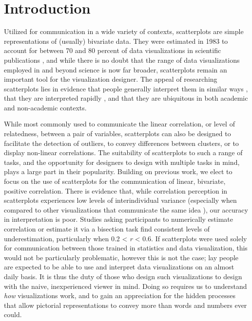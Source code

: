 \documentclass[manuscript,screen,review]{acmart}
\begin{document}
\setlength{\parskip}{-0.1pt}

\section{Introduction}\label{sec-intro}

Utilized for communication in a wide variety of contexts, scatterplots
are simple representations of (usually) bivariate data. They were
estimated in 1983 to account for between 70 and 80 percent of data
visualizations in scientific publications \citep{tufte_1983}, and while
there is no doubt that the range of data visualizations employed in and
beyond science is now far broader, scatterplots remain an important tool
for the visualization designer. The appeal of researching scatterplots
lies in evidence that people generally interpret them in similar ways
\citep{kay_2015}, that they are interpreted rapidly
\citep{rensink_2014}, and that they are ubiquitous in both academic
\citep{tufte_1983} and non-academic contexts.

While most commonly used to communicate the linear correlation, or level
of relatedness, between a pair of variables, scatterplots can also be
designed to facilitate the detection of outliers, to convey differences
between clusters, or to display non-linear correlations. The suitability
of scatterplots to such a range of tasks, and the opportunity for
designers to design with multiple tasks in mind, plays a large part in
their popularity. Building on previous work, we elect to focus on the
use of scatterplots for the communication of linear, bivariate, positive
correlation. There is evidence that, while correlation perception in
scatterplots experiences low levels of interindividual variance
(especially when compared to other visualizations that communicate the
same idea \citep{harrison_2014, kay_2015}), our accuracy in
interpretation is poor. Studies asking participants to numerically
estimate correlation
\citep{strahan_1978, bobko_1979, cleveland_1982, lane_1985, lauer_1989, collyer_1990, meyer_1992}
or estimate it via a bisection task \citep{rensink_2017} find consistent
levels of underestimation, particularly when 0.2 \textless{} \emph{r}
\textless{} 0.6. If scatterplots were used solely for communication
between those trained in statistics and data visualization, this would
not be particularly problematic, however this is not the case; lay
people are expected to be able to use and interpret data visualizations
on an almost daily basis. It is thus the duty of those who design such
visualizations to design with the naive, inexperienced viewer in mind.
Doing so requires us to understand \emph{how} visualizations work, and
to gain an appreciation for the hidden processes that allow pictorial
representations to convey more than words and numbers ever could.
\end{document}
